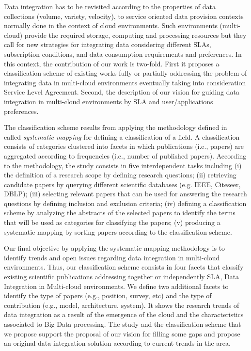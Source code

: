 Data integration has to be revisited according to  the properties of data collections (volume, variety, velocity), to service oriented data provision contexts normally done in the context of cloud environments. Such environments (multi-cloud)  provide the required storage, computing and processing resources but they call for new strategies for integrating data considering different SLAs, subscription conditions, and data consumption requirements and preferences. In this context, the contribution of our work is two-fold. First it proposes a classification scheme of existing works fully or partially addressing the problem of integrating data in multi-cloud environments eventually taking into consideration Service Level Agreement. Second, the description of our vision  for guiding data integration in multi-cloud environments  by SLA and user/applications preferences. 

The classification scheme results from  applying the  methodology defined in~\cite{SM:Petersen:2008} called  \textit{systematic mapping}  for defining a classification of a field. A classification consists of categories clustered into facets in which publications (i.e., papers) are aggregated according to frequencies (i.e., number of published papers). According to the methodology, the study consists in  five interdependent tasks including (i) the definition of a research scope by defining research questions; (ii) retrieving candidate papers by querying different scientific databases (e.g. IEEE, Citeseer, DBLP); (iii) selecting relevant papers that can be used for answering the research questions by defining inclusion and exclusion criteria; (iv) defining a classification scheme by analyzing the abstracts of the selected papers to identify the terms that will be used as categories for classifying the papers; (v) producing a systematic mapping by sorting papers according to the classification scheme. 

Our final objective by applying the systematic mapping methodology is to identify trends and open issues regarding data integration in multi-cloud environments. Thus, our classification scheme consists in four facets that classify existing scientific publications addressing  together or independently SLA, Data Integration in Multi-cloud environments. We define two additional facets to identify the type of papers (e.g., position, survey, etc) and the type of contribution (e.g., model, architecture, system). It shows the research trends of data integration as a result of the emergence of the cloud and the characteristics associated to Big Data processing. The study and the classification scheme that we propose support  the proposal of our vision for filling some gaps and propose an original data integration solution according to current trends in the area. 


